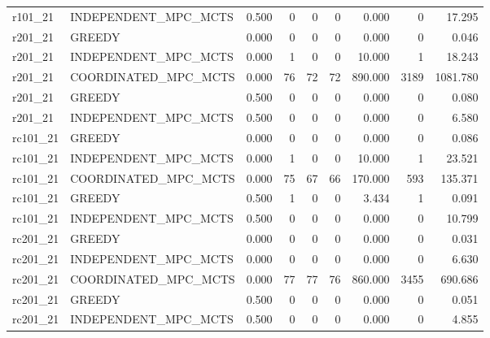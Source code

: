\begin{tabular}{llrrrrrrr}
r101\_21 & INDEPENDENT\_MPC\_MCTS & 0.500 & 0 & 0 & 0 & 0.000 & 0 & 17.295 \\
r201\_21 & GREEDY & 0.000 & 0 & 0 & 0 & 0.000 & 0 & 0.046 \\
r201\_21 & INDEPENDENT\_MPC\_MCTS & 0.000 & 1 & 0 & 0 & 10.000 & 1 & 18.243 \\
r201\_21 & COORDINATED\_MPC\_MCTS & 0.000 & 76 & 72 & 72 & 890.000 & 3189 & 1081.780 \\
r201\_21 & GREEDY & 0.500 & 0 & 0 & 0 & 0.000 & 0 & 0.080 \\
r201\_21 & INDEPENDENT\_MPC\_MCTS & 0.500 & 0 & 0 & 0 & 0.000 & 0 & 6.580 \\
rc101\_21 & GREEDY & 0.000 & 0 & 0 & 0 & 0.000 & 0 & 0.086 \\
rc101\_21 & INDEPENDENT\_MPC\_MCTS & 0.000 & 1 & 0 & 0 & 10.000 & 1 & 23.521 \\
rc101\_21 & COORDINATED\_MPC\_MCTS & 0.000 & 75 & 67 & 66 & 170.000 & 593 & 135.371 \\
rc101\_21 & GREEDY & 0.500 & 1 & 0 & 0 & 3.434 & 1 & 0.091 \\
rc101\_21 & INDEPENDENT\_MPC\_MCTS & 0.500 & 0 & 0 & 0 & 0.000 & 0 & 10.799 \\
rc201\_21 & GREEDY & 0.000 & 0 & 0 & 0 & 0.000 & 0 & 0.031 \\
rc201\_21 & INDEPENDENT\_MPC\_MCTS & 0.000 & 0 & 0 & 0 & 0.000 & 0 & 6.630 \\
rc201\_21 & COORDINATED\_MPC\_MCTS & 0.000 & 77 & 77 & 76 & 860.000 & 3455 & 690.686 \\
rc201\_21 & GREEDY & 0.500 & 0 & 0 & 0 & 0.000 & 0 & 0.051 \\
rc201\_21 & INDEPENDENT\_MPC\_MCTS & 0.500 & 0 & 0 & 0 & 0.000 & 0 & 4.855 \\
\bottomrule
\end{tabular}
